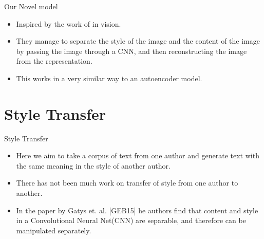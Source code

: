\documentclass{beamer}
\begin{document}
\begin{frame}{Our Novel model}
	\begin{itemize}
	\item Inspired by the work of \cite{} in vision.
	\item They manage to separate the style of the image and the content of the image by passing the image through a CNN, and then reconstructing the image from the representation.
	\item This works in a very similar way to an autoencoder model.
	\end{itemize}
\end{frame}
\section{Style Transfer}
\begin{frame}{Style Transfer}
\begin{itemize}
\item Here we aim to take a corpus of text from one author and generate text with the same meaning in the style of another author.
\item There has not been much work on transfer of style from one author to another.
\item In the paper by Gatys et. al. [GEB15] he  authors  find  that  content  and  style  in  a  Convolutional  Neural  Net(CNN)  are  separable,  and therefore can be manipulated separately.
\end{itemize}
\end{frame}
\end{document}
